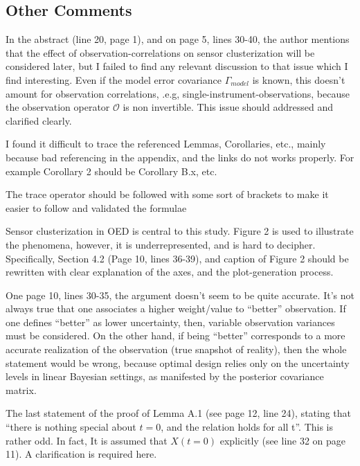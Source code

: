 \documentclass{amsart}
\begin{document}
\subsection{Other Comments}

In the abstract (line 20, page 1), and on page 5, lines 30-40, the
author mentions that the effect of observation-correlations on sensor
clusterization will be considered later, but I failed to find any
relevant discussion to that issue which I find interesting. Even if
the model error covariance $\Gamma_{model}$ is known, this doesn't
amount for observation correlations, .e.g,
single-instrument-observations, because the observation operator
$\mathcal{O}$ is non invertible. This issue should addressed and
clarified clearly.

I found it difficult to trace the referenced Lemmas, Corollaries,
etc., mainly because bad referencing in the appendix, and the links do
not works properly.  For example Corollary 2 should be Corollary B.x,
etc.

The trace operator should be followed with some sort of brackets to
make it easier to follow and validated the formulae

Sensor clusterization in OED is central to this study. Figure 2 is
used to illustrate the phenomena, however, it is underrepresented, and
is hard to decipher. Specifically, Section 4.2 (Page 10, lines 36-39),
and caption of Figure 2 should be rewritten with clear explanation of
the axes, and the plot-generation process.

One page 10, lines 30-35, the argument doesn't seem to be quite
accurate. It's not always true that one associates a higher
weight/value to ``better'' observation. If one defines ``better'' as
lower uncertainty, then, variable observation variances must be
considered. On the other hand, if being ``better'' corresponds to a
more accurate realization of the observation (true snapshot of
reality), then the whole statement would be wrong, because optimal
design relies only on the uncertainty levels in linear Bayesian
settings, as manifested by the posterior covariance matrix.

The last statement of the proof of Lemma A.1 (see page 12, line 24),
stating that ``there is nothing special about $t=0$, and the relation
holds for all t''. This is rather odd. In fact, It is assumed that
$X(t=0)$ explicitly (see line 32 on page 11). A clarification is
required here.
\end{document}
